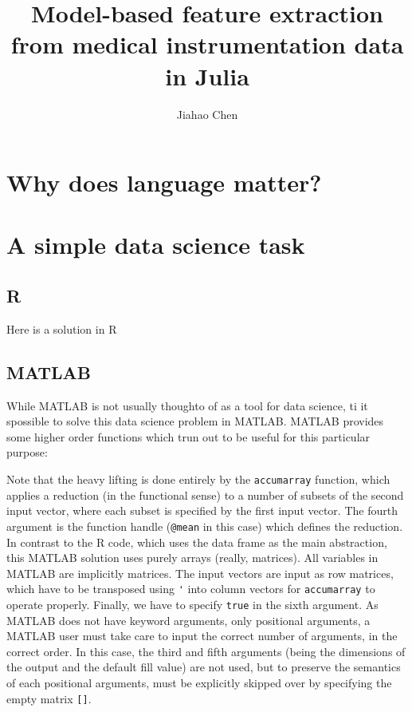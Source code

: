 \documentclass[fleqn,10pt,lineno]{wlpeerj} %
\title{Model-based feature extraction from medical instrumentation data in Julia}
\author[1]{Jiahao Chen}
\affil[1]{Computer Science and Artificial Intelligence Laboratory,
       Massachusetts Institute of Technology,
       Cambridge, Massachusetts, 02139}
\begin{document}
\flushbottom
\maketitle
\thispagestyle{empty}


\section{Why does language matter?}

\section{A simple data science task}

\subsection{R}

Here is a solution in R



\subsection{MATLAB}

While MATLAB is not usually thoughto of as a tool for data science, ti it spossible to solve this data science problem in MATLAB. MATLAB provides some higher order functions which trun out to be useful for this particular purpose:



Note that the heavy lifting is done entirely by the \lstinline|accumarray|
function, which applies a reduction (in the functional sense) to a number of
subsets of the second input vector, where each subset is specified by the first
input vector. The fourth argument is the function handle (\lstinline|@mean| in
this case) which defines the reduction. In contrast to the R code, which uses
the data frame as the main abstraction, this MATLAB solution uses purely arrays
(really, matrices). All variables in MATLAB are implicitly matrices. The input
vectors are input as row matrices, which have to be transposed using
\lstinline|'| into column vectors for \lstinline|accumarray| to operate
properly. Finally, we have to specify \lstinline|true| in the sixth argument. As
MATLAB does not have keyword arguments, only positional arguments, a MATLAB
user must take care to input the correct number of arguments, in the correct
order. In this case, the third and fifth arguments (being the dimensions of the
output and the default fill value) are not used, but to preserve the semantics
of each positional arguments, must be explicitly skipped over by specifying the
empty matrix \lstinline|[]|.
\end{document}
